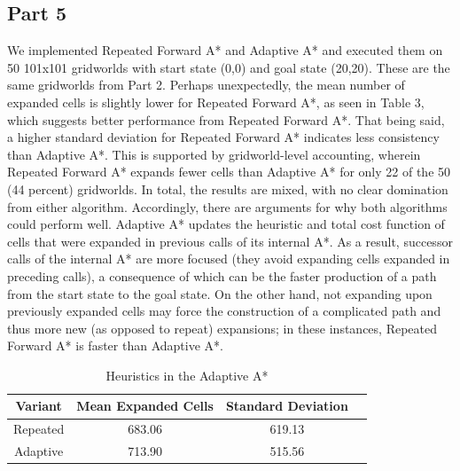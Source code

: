 \documentclass{article}
\begin{document}
\subsection*{Part 5}
We implemented Repeated Forward A* and Adaptive A* and executed them on 50 101x101 gridworlds with start state (0,0) and goal state (20,20). These are the same gridworlds from Part 2. Perhaps unexpectedly, the mean number of expanded cells is slightly lower for Repeated Forward A*, as seen in Table 3, which suggests better performance from Repeated Forward A*. That being said, a higher standard deviation for Repeated Forward A* indicates less consistency than Adaptive A*. This is supported by gridworld-level accounting, wherein Repeated Forward A* expands fewer cells than Adaptive A* for only 22 of the 50 (44 percent) gridworlds. In total, the results are mixed, with no clear domination from either algorithm. Accordingly, there are arguments for why both algorithms could perform well. Adaptive A* updates the heuristic and total cost function of cells that were expanded in previous calls of its internal A*. As a result, successor calls of the internal A* are more focused (they avoid expanding cells expanded in preceding calls), a consequence of which can be the faster production of a path from the start state to the goal state. On the other hand, not expanding upon previously expanded cells may force the construction of a complicated path and thus more new (as opposed to repeat) expansions; in these instances, Repeated Forward A* is faster than Adaptive A*.\\

\begin{table}[!h]
    \centering
    \small
    \begin{tabular}{cccc}
        \hline
         Variant & Mean Expanded Cells & Standard Deviation\\
         \hline
         Repeated & 683.06 & 619.13\\
         Adaptive & 713.90 & 515.56\\
        \hline
    \end{tabular}
    \caption{Heuristics in the Adaptive A*}
    \label{tab:my_label}
\end{table}
\end{document}
